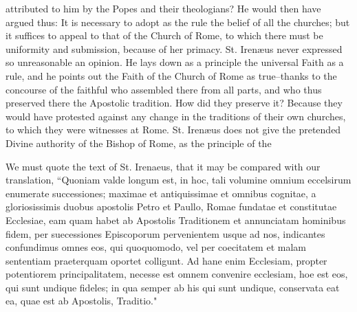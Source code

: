 attributed to him by the Popes and their theologians? He would then have argued thus: It is necessary to adopt as the rule the belief of all the churches; but it suffices to appeal to that of the Church of Rome, to which there must be uniformity and submission, because of her primacy. St. Irenæus never expressed so unreasonable an opinion. He lays down as a principle the universal Faith as a rule, and he points out the Faith of the Church of Rome as true--thanks to the concourse of the faithful who assembled there from all parts, and who thus preserved there the Apostolic tradition. How did they preserve it? Because they would have protested against any change in the traditions of their own churches, to which they were witnesses at Rome. St. Irenæus does not give the pretended Divine authority of the Bishop of Rome, as the principle of the

We must quote the text of St. Irenaeus, that it may be compared with our translation, “Quoniam valde longum est, in hoc, tali volumine omnium eccelsirum enumerate successiones; maximae et antiquissimae et omnibus cognitae, a gloriosissimis duobus apostolis Petro et Paullo, Romae fundatae et constitutae Ecclesiae, eam quam habet ab Apostolis Traditionem et annunciatam hominibus fidem, per suecessiones Episcoporum pervenientem usque ad nos, indicantes confundimus omnes eos, qui quoquomodo, vel per coecitatem et malam sententiam praeterquam oportet colligunt. Ad hane enim Ecclesiam, propter potentiorem principalitatem, necesse est omnem convenire ecclesiam, hoe est eos, qui sunt undique fideles; in qua semper ab his qui sunt undique, conservata eat ea, quae est ab Apostolis, Traditio."

